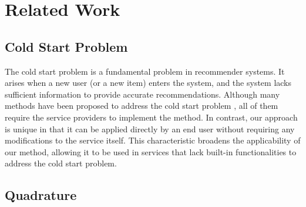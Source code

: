 \section{Related Work}
\subsection{Cold Start Problem}

The cold start problem is a fundamental problem in recommender systems. It arises when a new user (or a new item) enters the system, and the system lacks sufficient information to provide accurate recommendations. Although many methods have been proposed to address the cold start problem \cite{park2006naive, gantner2010learning, lika2014facing, wang2019enhansing}, all of them require the service providers to implement the method. In contrast, our approach is unique in that it can be applied directly by an end user without requiring any modifications to the service itself. This characteristic broadens the applicability of our method, allowing it to be used in services that lack built-in functionalities to address the cold start problem.


\subsection{Quadrature}

